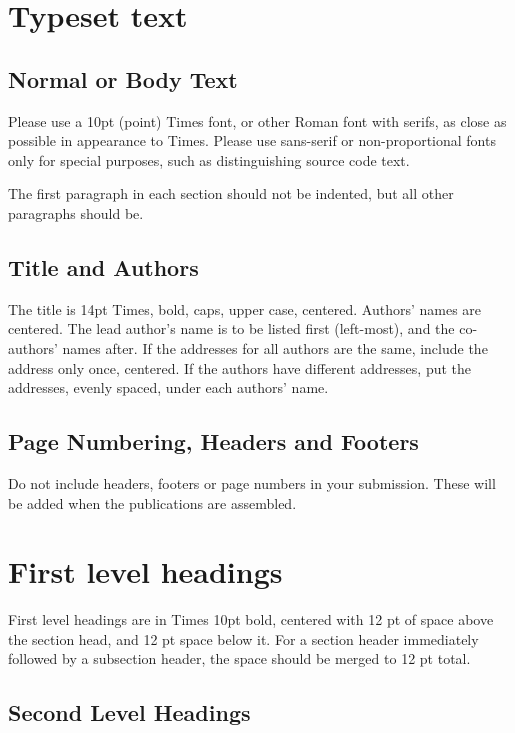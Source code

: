 \documentclass[twoside,10pt]{article}
\begin{document}
\section{Typeset text}\label{sec:typeset_text}

\subsection{Normal or Body Text}\label{subsec:body}

Please use a 10pt (point) Times font, or other Roman font with serifs, as close as possible in appearance to Times. Please use sans-serif or non-proportional fonts only for special purposes, such as distinguishing source code text.

The first paragraph in each section should not be indented, but all other paragraphs should be.

\subsection{Title and Authors}

The title is 14pt Times, bold, caps, upper case, centered. Authors' names are centered. The lead author's name is to be listed first (left-most), and the co-authors' names after. If the addresses for all authors are the same, include the address only once, centered. If the authors have different addresses, put the addresses, evenly spaced, under each authors' name.

\subsection{Page Numbering, Headers and Footers}

Do not include headers, footers or page numbers in your submission. These will be added when the publications are assembled.

\section{First level headings}

First level headings are in Times 10pt bold, centered with 12 pt of space above the section head, and 12 pt space below it.  For a section header immediately followed by a subsection header, the space should be merged to 12 pt total.

\subsection{Second Level Headings}
\end{document}
